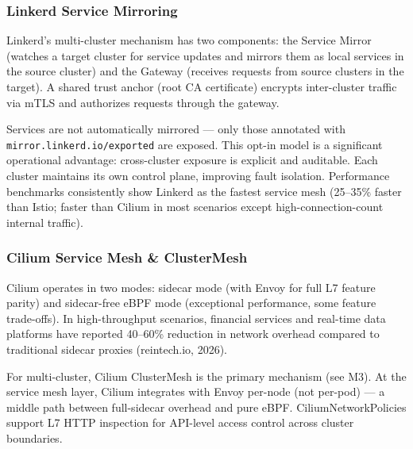\documentclass[11pt,letterpaper]{article}
\begin{document}
\subsubsection{Linkerd Service Mirroring}

Linkerd's multi-cluster mechanism has two components: the Service Mirror (watches a target cluster for service updates and mirrors them as local services in the source cluster) and the Gateway (receives requests from source clusters in the target). A shared trust anchor (root CA certificate) encrypts inter-cluster traffic via mTLS and authorizes requests through the gateway.

Services are not automatically mirrored --- only those annotated with \texttt{mirror.linkerd.io/exported} are exposed. This opt-in model is a significant operational advantage: cross-cluster exposure is explicit and auditable. Each cluster maintains its own control plane, improving fault isolation. Performance benchmarks consistently show Linkerd as the fastest service mesh (25--35\% faster than Istio; faster than Cilium in most scenarios except high-connection-count internal traffic).

\subsubsection{Cilium Service Mesh \& ClusterMesh}

Cilium operates in two modes: sidecar mode (with Envoy for full L7 feature parity) and sidecar-free eBPF mode (exceptional performance, some feature trade-offs). In high-throughput scenarios, financial services and real-time data platforms have reported 40--60\% reduction in network overhead compared to traditional sidecar proxies (reintech.io, 2026).

For multi-cluster, Cilium ClusterMesh is the primary mechanism (see M3). At the service mesh layer, Cilium integrates with Envoy per-node (not per-pod) --- a middle path between full-sidecar overhead and pure eBPF. CiliumNetworkPolicies support L7 HTTP inspection for API-level access control across cluster boundaries.
\end{document}
